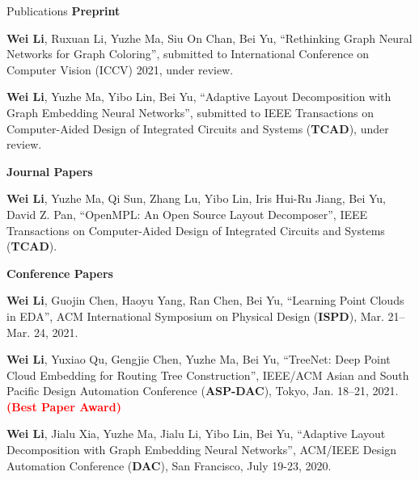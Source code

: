 \begin{rSection}{Publications}
    \textbf{Preprint}
    \begin{description}[font=\normalfont]
        \item[{[C10]}]{
            \textbf{Wei Li}, Ruxuan Li, Yuzhe Ma, Siu On Chan, Bei Yu,
            ``Rethinking Graph Neural Networks for Graph Coloring'', submitted to International Conference on Computer Vision (ICCV) 2021, under review.
        }
        \item[{[J2]}]{
            \textbf{Wei Li}, Yuzhe Ma, Yibo Lin, Bei Yu, 
            ``Adaptive Layout Decomposition with Graph Embedding Neural Networks'', submitted to IEEE Transactions on Computer-Aided Design of Integrated Circuits and Systems (\textbf{TCAD}), under review.
        }
    \end{description}
    \textbf{Journal Papers}
    \begin{description}[font=\normalfont]
        \item[{[J1]}]{
            \textbf{Wei Li}, Yuzhe Ma, Qi Sun, Zhang Lu, Yibo Lin, Iris Hui-Ru Jiang, Bei Yu, David Z. Pan,
            ``OpenMPL: An Open Source Layout Decomposer'', IEEE Transactions on Computer-Aided Design of Integrated Circuits and Systems (\textbf{TCAD}).
        }
    \end{description}
\textbf{Conference Papers}
\begin{description}[font=\normalfont]
\item[{[C9]}]{
    \textbf{Wei Li}, Guojin Chen, Haoyu Yang, Ran Chen, Bei Yu,
    ``Learning Point Clouds in EDA'', 
    ACM International Symposium on Physical Design (\textbf{ISPD}), Mar. 21–Mar. 24, 2021.
}
\item[{[C8]}]{
    \textbf{Wei Li}, Yuxiao Qu, Gengjie Chen, Yuzhe Ma, Bei Yu,
    ``TreeNet: Deep Point Cloud Embedding for Routing Tree Construction'', 
    IEEE/ACM Asian and South Pacific Design Automation Conference (\textbf{ASP-DAC}), Tokyo, Jan. 18–21, 2021. \textcolor{red}{\textbf{(Best Paper Award)}}
}
\item[{[C7]}]{
    \textbf{Wei Li}, Jialu Xia, Yuzhe Ma, Jialu Li, Yibo Lin, Bei Yu, 
    ``Adaptive Layout Decomposition with Graph Embedding Neural Networks'', 
    ACM/IEEE Design Automation Conference (\textbf{DAC}), San Francisco, July 19-23, 2020.
}
\end{description}
\end{rSection}
